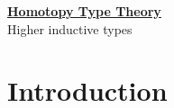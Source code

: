 \documentclass[hott-all.tex]{subfiles}
\begin{document}
\begin{center}
  {\Large{\underline{\textbf{Homotopy Type Theory}}}} \\[2mm]
  {\large Higher inductive types}
\end{center}

\setcounter{chapter}{6}

% 
% 
\section{Introduction}
% 
% 
\end{document}
